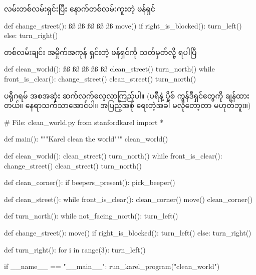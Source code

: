လမ်းတစ်လမ်းရှင်းပြီး နောက်တစ်လမ်းကူးတဲ့ ဖန်ရှင်
%
\begin{py}
def change_street():
    ßß
    ßß
    ßß
    ßß
    ßß
    move()
    if right_is_blocked():
        turn_left()
    else:
        turn_right()
\end{py}
%
တစ်လမ်းချင်း အမှိုက်အကုန် ရှင်းတဲ့ ဖန်ရှင်ကို သတ်မှတ်လို့ ရပါပြီ
%
\begin{py}
def clean_world():
    ßß
    ßß
    ßß
    ßß
    ßß
    clean_street()
    turn_north()
    while front_is_clear():
        change_street()
        clean_street()
        turn_north()
\end{py}
%
ပရိုဂရမ် အစအဆုံး ဆက်လက်လေ့လာကြည့်ပါ။ (ပရီနဲ့ ပို့စ် ကွန်ဒီရှင်တွေကို ချန်ထားတယ်။ နေရာသက်သာအောင်ပါ။ အပြည့်အစုံ ရေးတဲ့အခါ မလိုတော့တာ မဟုတ်ဘူး။)
%
\begin{py}
# File: clean_world.py
from stanfordkarel import *


def main():
    """Karel clean the world"""
    clean_world()


def clean_world():
    clean_street()
    turn_north()
    while front_is_clear():
        change_street()
        clean_street()
        turn_north()


def clean_corner():
    if beepers_present():
        pick_beeper()


def clean_street():
    while front_is_clear():
        clean_corner()
        move()
    clean_corner()


def turn_north():
    while not_facing_north():
        turn_left()


def change_street():
    move()
    if right_is_blocked():
        turn_left()
    else:
        turn_right()


def turn_right():
    for i in range(3):
        turn_left()


if __name__ == "__main__":
    run_karel_program("clean_world")
\end{py}
%
